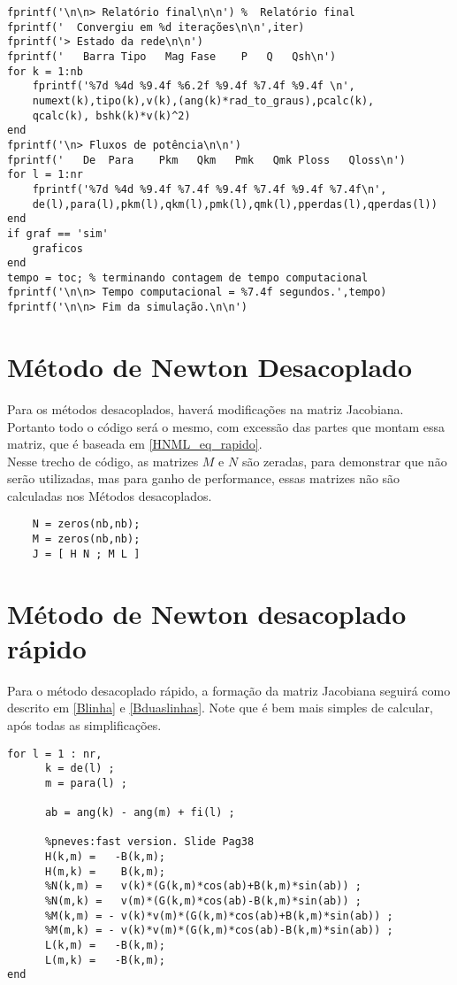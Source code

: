 \begin{verbatim}
fprintf('\n\n> Relatório final\n\n') %	Relatório final
fprintf('  Convergiu em %d iterações\n\n',iter)
fprintf('> Estado da rede\n\n')
fprintf('   Barra Tipo   Mag Fase    P   Q   Qsh\n')
for k = 1:nb
    fprintf('%7d %4d %9.4f %6.2f %9.4f %7.4f %9.4f \n',
    numext(k),tipo(k),v(k),(ang(k)*rad_to_graus),pcalc(k),
    qcalc(k), bshk(k)*v(k)^2)
end
fprintf('\n> Fluxos de potência\n\n')
fprintf('   De  Para    Pkm   Qkm   Pmk   Qmk Ploss   Qloss\n')
for l = 1:nr
    fprintf('%7d %4d %9.4f %7.4f %9.4f %7.4f %9.4f %7.4f\n',
    de(l),para(l),pkm(l),qkm(l),pmk(l),qmk(l),pperdas(l),qperdas(l))
end
if graf == 'sim'
    graficos
end
tempo = toc; % terminando contagem de tempo computacional
fprintf('\n\n> Tempo computacional = %7.4f segundos.',tempo)
fprintf('\n\n> Fim da simulação.\n\n')
\end{verbatim}

\section{Método de Newton Desacoplado}
Para os métodos desacoplados, haverá modificações na matriz Jacobiana. Portanto todo o código será o mesmo, com excessão das partes que montam essa matriz, que é baseada em \ref{HNML_eq_rapido}.\\ 
Nesse trecho de código, as matrizes $M$ e $N$ são zeradas, para demonstrar que não serão utilizadas, mas para ganho de performance, essas matrizes não são calculadas nos Métodos desacoplados.
\begin{verbatim}
    N = zeros(nb,nb);
    M = zeros(nb,nb);
    J = [ H N ; M L ]
\end{verbatim}

\section{Método de Newton desacoplado rápido} 
Para o método desacoplado rápido, a formação da matriz Jacobiana seguirá como descrito em \ref{Blinha} e \ref{Bduaslinhas}. Note que é bem mais simples de calcular, após todas as simplificações.
\begin{verbatim}
for l = 1 : nr,
      k = de(l) ;
      m = para(l) ;

      ab = ang(k) - ang(m) + fi(l) ;
      
      %pneves:fast version. Slide Pag38
      H(k,m) =   -B(k,m);
      H(m,k) =    B(k,m);
      %N(k,m) =   v(k)*(G(k,m)*cos(ab)+B(k,m)*sin(ab)) ;
      %N(m,k) =   v(m)*(G(k,m)*cos(ab)-B(k,m)*sin(ab)) ;
      %M(k,m) = - v(k)*v(m)*(G(k,m)*cos(ab)+B(k,m)*sin(ab)) ;
      %M(m,k) = - v(k)*v(m)*(G(k,m)*cos(ab)-B(k,m)*sin(ab)) ;
      L(k,m) =   -B(k,m);
      L(m,k) =   -B(k,m);
end
\end{verbatim}